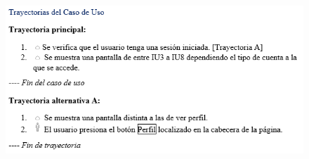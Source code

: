 \documentclass[12pt,letterpaper]{article}
\begin{document}
            \begin{figure}[H]
                \centering
                \includegraphics [scale=0.9]{casosUso/trayectoriaVerPerfil}
            \end{figure}
\end{document}
